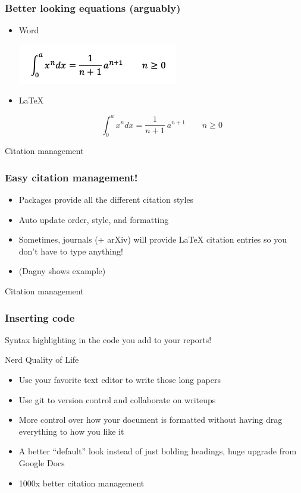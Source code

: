 \documentclass{beamer}
\newcommand{\latex}{\LaTeX\xspace}
\begin{document}
\begin{frame}[fragile]
  \frametitle{Better looking equations (arguably)}

  \begin{itemize}

  \item{Word}

  \includegraphics[scale=.75]{word-equation.png}

  \item{\latex}

  \begin{equation}
  \int_0^a x^n dx = \frac{1}{n+1}\
  a^{n+1} \qquad n \geq 0
  \end{equation}

  \end{itemize}

\end{frame}

\begin{frame}{Citation management}
  \frametitle{Easy citation management!}
  \begin{itemize}
    \item<1-> {Packages provide all the different citation styles}
    \item<2-> {Auto update order, style, and formatting}
    \item<3-> {Sometimes, journals (+ arXiv) will provide \latex citation entries so you don't have to type anything!}
    \item<4-> {(Dagny shows example)}
  \end{itemize}
\end{frame}

\begin{frame}{Citation management}
  \frametitle{Inserting code}
  Syntax highlighting in the code you add to your reports!
\end{frame}

\begin{frame}{Nerd Quality of Life}
  \begin{itemize}
    \item<1-> {Use your favorite text editor to write those long papers}
    \item<2-> {Use git to version control and collaborate on writeups}
    \item<3-> {More control over how your document is formatted without having drag everything to how you like it}
    \item<4-> {A better ``default'' look instead of just bolding headings, huge upgrade from Google Docs}
    \item<5-> {1000x better citation management}
  \end{itemize}
\end{frame}
\end{document}
